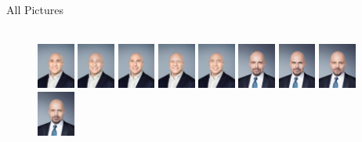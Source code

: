 \documentclass[10pt]{beamer}
\begin{document}
{\begin{frame}{All Pictures}
\begin{adjustwidth}
\begin{figure}[h!]
\\
\centering
\includegraphics[width=0.11\textwidth]{img/pic/ward-WM-218.jpg}\hfill
\includegraphics[width=0.11\textwidth]{img/pic/ward-WM-248.jpg}\hfill
\includegraphics[width=0.11\textwidth]{img/pic/ward-WM-238.jpg}\hfill
\includegraphics[width=0.11\textwidth]{img/pic/ward-WM-249.jpg}\hfill
\includegraphics[width=0.11\textwidth]{img/pic/ward-WM-018.jpg}\hfill
\includegraphics[width=0.11\textwidth]{img/pic/blackwell-WM-211.jpg}\hfill
\includegraphics[width=0.11\textwidth]{img/pic/blackwell-WM-241.jpg}\hfill
\includegraphics[width=0.11\textwidth]{img/pic/blackwell-WM-214.jpg}\hfill
\includegraphics[width=0.11\textwidth]{img/pic/blackwell-WM-018.jpg}


\end{figure}
\end{adjustwidth}
\end{frame}}
\end{document}
